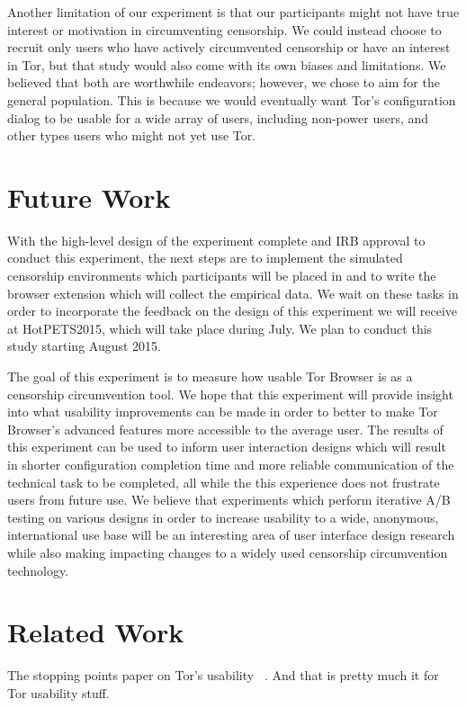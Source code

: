 \documentclass[letterpaper,twocolumn,11pt]{article}
\begin{document}
Another limitation of our experiment is that our participants might not have true interest or motivation in
circumventing censorship. We could instead choose to recruit only users who have actively circumvented
censorship or have an interest in Tor, but that study would also come with its own biases and limitations.
We believed that both are worthwhile endeavors; however, we chose to aim for the general population. 
This is because we would eventually want Tor's configuration dialog to be usable for a wide array of users, 
including non-power users, and other types users who might not yet use Tor. 

\section{Future Work}
\indent \indent With the high-level design of the experiment complete and IRB approval  to conduct this
experiment,  the next steps are to implement the simulated censorship environments which participants 
will be placed in and to write the browser extension which will collect the empirical data. 
We wait on these tasks in order to incorporate the feedback on the design of this experiment 
we will receive at HotPETS2015, which will take place during July. We plan to conduct this study starting 
August 2015. 

The goal of this experiment is to measure how usable Tor Browser is as a censorship circumvention
tool. We hope that this experiment will provide insight into what usability improvements can be made 
in order to better to make Tor Browser's advanced features more accessible to the average user. The results
of this experiment can be used to inform user interaction designs which will result in shorter configuration
completion time and more reliable communication of the technical task to be completed, all while the 
this experience does not frustrate users from future use. We believe that experiments which perform
iterative A/B testing on various designs in order to increase usability to a wide, anonymous, international 
use base will be an interesting area of user interface design research while also making impacting changes
to a widely used censorship circumvention technology. 

\section{Related Work} %
 {\color {red} The stopping points paper on Tor's usability ~\cite{norcie2012eliminating}. 
And that is pretty much it for Tor usability stuff.} %
\end{document}
